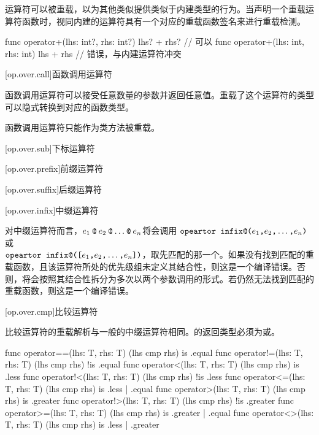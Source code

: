 \pnum
运算符可以被重载，以为其他类似提供类似于内建类型的行为。当声明一个重载运算符函数时，视同内建的运算符具有一个对应的重载函数签名来进行重载检测。

\enterexample
\begin{codeblock}
func operator+(lhs: int?, rhs: int?) { lhs? + rhs? } // 可以
func operator+(lhs: int, rhs: int) { lhs + rhs } // 错误，与内建运算符冲突
\end{codeblock}
\exitexample

[op.over.call]{函数调用运算符}

\pnum
函数调用运算符可以接受任意数量的参数并返回任意值。重载了这个运算符的类型可以隐式转换到对应的函数类型。

\pnum
函数调用运算符只能作为类方法被重载。

[op.over.sub]{下标运算符}

[op.over.prefix]{前缀运算符}

[op.over.suffix]{后缀运算符}

[op.over.infix]{中缀运算符}

\pnum
对中缀运算符而言，$e_1\mathbin{\texttt{@}}e_2\mathbin{\texttt{@}}\ldots\mathbin{\texttt{@}}e_n$将会调用
$\texttt{opeartor infix@(}e_1\texttt{,}e_2\texttt{,}\ldots\texttt{,}e_n\texttt{)}$或\\$\texttt{opeartor infix@([}e_1\texttt{,}e_2\texttt{,}\ldots\texttt{,}e_n\texttt{])}$，取先匹配的那一个。如果没有找到匹配的重载函数，且该运算符所处的优先级组未定义其结合性，则这是一个编译错误。否则，将会按照其结合性拆分为多次以两个参数调用的形式。若仍然无法找到匹配的重载函数，则这是一个编译错误。

[op.over.cmp]{比较运算符}

\pnum
比较运算符的重载解析与一般的中缀运算符相同。的返回类型必须为或。

\begin{codeblock}
func operator==(lhs: T, rhs: T) { (lhs cmp rhs) is .equal }
func operator!=(lhs: T, rhs: T) { (lhs cmp rhs) !is .equal }
func operator<(lhs: T, rhs: T) { (lhs cmp rhs) is .less }
func operator!<(lhs: T, rhs: T) { (lhs cmp rhs) !is .less }
func operator<=(lhs: T, rhs: T) { (lhs cmp rhs) is .less | .equal }
func operator>(lhs: T, rhs: T) { (lhs cmp rhs) is .greater }
func operator!>(lhs: T, rhs: T) { (lhs cmp rhs) !is .greater }
func operator>=(lhs: T, rhs: T) { (lhs cmp rhs) is .greater | .equal }
func operator<>(lhs: T, rhs: T) { (lhs cmp rhs) is .less | .greater }
\end{codeblock}

